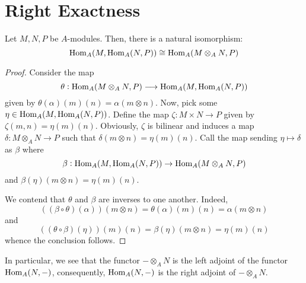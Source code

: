 \section{Right Exactness}

\begin{proposition}
    Let $M,N,P$ be $A$-modules. Then, there is a natural isomorphism:
    \begin{equation*}
        \operatorname{Hom}_A(M,\operatorname{Hom}_A(N, P))\cong\operatorname{Hom}_A(M\otimes_A N, P)
    \end{equation*}
\end{proposition}
\begin{proof}
    Consider the map 
    \begin{equation*}
        \theta: \operatorname{Hom}_A(M\otimes_A N, P)\longrightarrow\operatorname{Hom}_A(M,\operatorname{Hom}_A(N, P))
    \end{equation*}
    given by $\theta(\alpha)(m)(n) = \alpha(m\otimes n)$. Now, pick some $\eta\in\operatorname{Hom}_A(M,\operatorname{Hom}_A(N,P))$. Define the map $\zeta: M\times N\to P$ given by $\zeta(m, n) = \eta(m)(n)$. Obviously, $\zeta$ is bilinear and induces a map $\delta: M\otimes_A N\to P$ such that $\delta(m\otimes n) = \eta(m)(n)$. Call the map sending $\eta\mapsto\delta$ as $\beta$ where 
    \begin{equation*}
        \beta: \operatorname{Hom}_A(M,\operatorname{Hom}_A(N, P))\to\operatorname{Hom}_A(M\otimes_A N, P)
    \end{equation*}
    and $\beta(\eta)(m\otimes n) = \eta(m)(n)$.

    We contend that $\theta$ and $\beta$ are inverses to one another. Indeed, 
    \begin{equation*}
        ((\beta\circ\theta)(\alpha))(m\otimes n) = \theta(\alpha)(m)(n) = \alpha(m\otimes n)
    \end{equation*}
    and 
    \begin{equation*}
        ((\theta\circ\beta)(\eta))(m)(n) = \beta(\eta)(m\otimes n) = \eta(m)(n)
    \end{equation*}
    whence the conclusion follows.
\end{proof}

In particular, we see that the functor $-\otimes_A N$ is the left adjoint of the functor $\operatorname{Hom}_A(N,-)$, consequently, $\operatorname{Hom}_A(N,-)$ is the right adjoint of $-\otimes_A N$.

